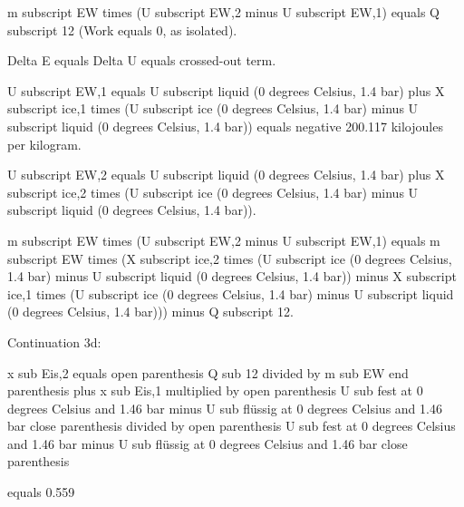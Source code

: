 m subscript EW times (U subscript EW,2 minus U subscript EW,1) equals Q subscript 12 (Work equals 0, as isolated).  

Delta E equals Delta U equals crossed-out term.  

U subscript EW,1 equals U subscript liquid (0 degrees Celsius, 1.4 bar) plus X subscript ice,1 times (U subscript ice (0 degrees Celsius, 1.4 bar) minus U subscript liquid (0 degrees Celsius, 1.4 bar)) equals negative 200.117 kilojoules per kilogram.  

U subscript EW,2 equals U subscript liquid (0 degrees Celsius, 1.4 bar) plus X subscript ice,2 times (U subscript ice (0 degrees Celsius, 1.4 bar) minus U subscript liquid (0 degrees Celsius, 1.4 bar)).  

m subscript EW times (U subscript EW,2 minus U subscript EW,1) equals m subscript EW times (X subscript ice,2 times (U subscript ice (0 degrees Celsius, 1.4 bar) minus U subscript liquid (0 degrees Celsius, 1.4 bar)) minus X subscript ice,1 times (U subscript ice (0 degrees Celsius, 1.4 bar) minus U subscript liquid (0 degrees Celsius, 1.4 bar))) minus Q subscript 12.

Continuation 3d:  

x sub Eis,2 equals open parenthesis Q sub 12 divided by m sub EW end parenthesis plus x sub Eis,1 multiplied by open parenthesis U sub fest at 0 degrees Celsius and 1.46 bar minus U sub flüssig at 0 degrees Celsius and 1.46 bar close parenthesis divided by open parenthesis U sub fest at 0 degrees Celsius and 1.46 bar minus U sub flüssig at 0 degrees Celsius and 1.46 bar close parenthesis  

equals 0.559